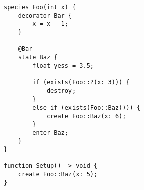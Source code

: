 \documentclass{minimal}
\begin{document}
\begin{verbatim}
species Foo(int x) {
    decorator Bar {
        x = x - 1;
    }

    @Bar
    state Baz {
        float yess = 3.5;

        if (exists(Foo::?(x: 3))) {
            destroy;
        }
        else if (exists(Foo::Baz())) {
            create Foo::Baz(x: 6);
        }
        enter Baz;
    }
}

function Setup() -> void {
    create Foo::Baz(x: 5);
}
\end{verbatim}
\end{document}
